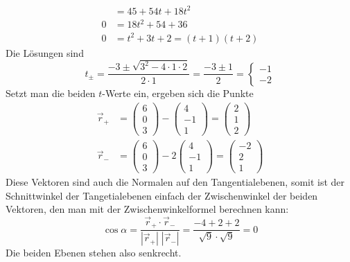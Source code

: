 \begin{loesung}
\begin{align*}
&=45+54t+18t^2
\\
0&=18t^2+54+36
\\
0&=t^2+3t+2=(t+1)(t+2)
\end{align*}
Die Lösungen sind
\[
t_{\pm}=\frac{-3\pm\sqrt{3^2-4\cdot1\cdot 2}}{2\cdot 1}
=\frac{-3\pm1}{2}
=\begin{cases}
-1\\
-2
\end{cases}
\]
Setzt man die beiden $t$-Werte ein, ergeben sich die Punkte
\begin{align*}
\vec r_+&=
\begin{pmatrix}6\\0\\3\end{pmatrix}
-
\begin{pmatrix}4\\-1\\1\end{pmatrix}
=
\begin{pmatrix}2\\1\\2\end{pmatrix}
\\
\vec r_-&=
\begin{pmatrix}6\\0\\3\end{pmatrix}
-2
\begin{pmatrix}4\\-1\\1\end{pmatrix}
=
\begin{pmatrix}-2\\2\\1\end{pmatrix}
\end{align*}
Diese Vektoren sind auch die Normalen auf den Tangentialebenen,
somit ist der Schnittwinkel der Tangetialebenen einfach der
Zwischenwinkel der beiden Vektoren, den man mit der Zwischenwinkelformel
berechnen kann:
\[
\cos \alpha=
\frac{\vec r_+\cdot\vec r_-} {|\vec r_+|\;|\vec r_-|}
=\frac{-4+2+2}{\sqrt{9}\cdot \sqrt{9}}=0
\]
Die beiden Ebenen stehen also senkrecht.
\end{loesung}

